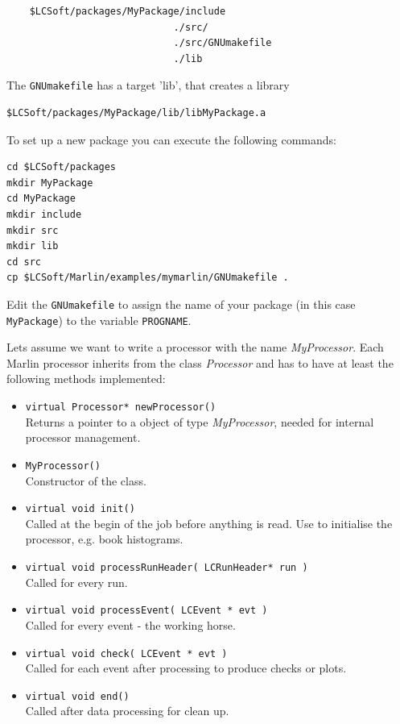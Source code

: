 \begin{verbatim}
    $LCSoft/packages/MyPackage/include
                             ./src/
                             ./src/GNUmakefile
                             ./lib
\end{verbatim}

The {\tt GNUmakefile} has a target 'lib', that creates a library

\begin{verbatim}
$LCSoft/packages/MyPackage/lib/libMyPackage.a
\end{verbatim}

To set up a new package you can execute the following commands: 

\begin{verbatim}
cd $LCSoft/packages
mkdir MyPackage
cd MyPackage
mkdir include
mkdir src
mkdir lib
cd src
cp $LCSoft/Marlin/examples/mymarlin/GNUmakefile .
\end{verbatim}

Edit the {\tt GNUmakefile} to assign the name of your package 
(in this case {\tt MyPackage}) to the variable {\tt PROGNAME}.

Lets assume we want to write a processor with the name 
{\em MyProcessor}.
Each Marlin processor inherits from the class {\em Processor} and has to have
at least the following methods implemented:

\begin{itemize}
\item {\tt virtual Processor*  newProcessor()} \\
      Returns a pointer to a object of type {\em MyProcessor},
      needed for internal processor management.
\item {\tt MyProcessor()} \\
      Constructor of the class.
\item {\tt virtual void init()} \\
      Called at the begin of the job before anything is read.
      Use to initialise the processor, e.g. book histograms.
\item {\tt virtual void processRunHeader( LCRunHeader* run )} \\
      Called for every run.
\item {\tt virtual void processEvent( LCEvent * evt )} \\
      Called for every event - the working horse.
\item {\tt virtual void check( LCEvent * evt )} \\
      Called for each event after processing to produce checks or plots. 
\item {\tt virtual void end()} \\
      Called after data processing for clean up.
\end{itemize}

